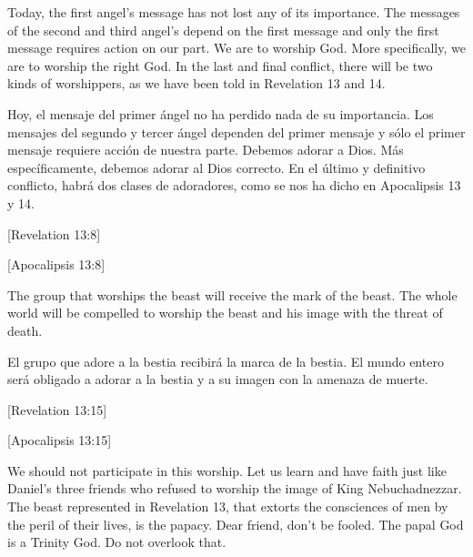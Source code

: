 Today, the first angel’s message has not lost any of its importance. The messages of the second and third angel’s depend on the first message and only the first message requires action on our part. We are to worship God. More specifically, we are to worship the right God. In the last and final conflict, there will be two kinds of worshippers, as we have been told in Revelation 13 and 14.


Hoy, el mensaje del primer ángel no ha perdido nada de su importancia. Los mensajes del segundo y tercer ángel dependen del primer mensaje y sólo el primer mensaje requiere acción de nuestra parte. Debemos adorar a Dios. Más específicamente, debemos adorar al Dios correcto. En el último y definitivo conflicto, habrá dos clases de adoradores, como se nos ha dicho en Apocalipsis 13 y 14.


[Revelation 13:8]


[Apocalipsis 13:8]


The group that worships the beast will receive the mark of the beast. The whole world will be compelled to worship the beast and his image with the threat of death.


El grupo que adore a la bestia recibirá la marca de la bestia. El mundo entero será obligado a adorar a la bestia y a su imagen con la amenaza de muerte.


[Revelation 13:15]


[Apocalipsis 13:15]


We should not participate in this worship. Let us learn and have faith just like Daniel’s three friends who refused to worship the image of King Nebuchadnezzar. The beast represented in Revelation 13, that extorts the consciences of men by the peril of their lives, is the papacy. Dear friend, don't be fooled. The papal God is a Trinity God. Do not overlook that.


